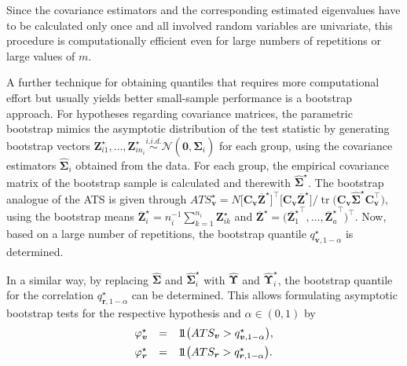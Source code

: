 Since the covariance estimators and the corresponding estimated eigenvalues
have to be calculated only once and all involved random variables are
univariate, this procedure is computationally efficient even for large numbers
of repetitions or large values of \(m\).

A further technique for obtaining quantiles that requires more computational
effort but usually yields better small-sample performance is a bootstrap
approach. For hypotheses regarding covariance matrices, the parametric
bootstrap mimics the asymptotic distribution of the test statistic by
generating bootstrap vectors
\(\boldsymbol{Z}_{i1}^\star, \dots, \boldsymbol{Z}_{in_i}^\star
\stackrel{i.i.d.}{\sim}
\mathcal{N}(\mathbf{0}, \widehat{\boldsymbol{\Sigma}}_i)\)
for each group, using the covariance estimators
\(\widehat{\boldsymbol{\Sigma}}_i\) obtained from the data. For each group, the empirical covariance matrix of the bootstrap sample is
calculated and therewith \(\widehat{\boldsymbol{\Sigma}}^\star\). The bootstrap analogue of
the ATS is given through \(ATS_{\boldsymbol{v}}^\star=
N
\bigl[
\boldsymbol{C}_{\boldsymbol{v}} \overline{\boldsymbol{Z}}^\star
\bigr]^\top
\bigl[
\boldsymbol{C}_{\boldsymbol{v}} \overline{\boldsymbol{Z}}^\star
\bigr]
\Big/
\operatorname{tr}
\bigl(
\boldsymbol{C}_{\boldsymbol{v}}
\widehat{\boldsymbol{\Sigma}}^\star
\boldsymbol{C}_{\boldsymbol{v}}^\top
\bigr),\) using the bootstrap means
\(\overline{\boldsymbol{Z}}_i^\star
=
n_i^{-1}
\sum_{k=1}^{n_i} \boldsymbol{Z}_{ik}^\star\)
and
\(\overline{\boldsymbol{Z}}^\star
=
\bigl(
{\overline{\boldsymbol{Z}}_1^\star}^\top, \dots,
{\overline{\boldsymbol{Z}}_a^\star}^\top
\bigr)^\top\). Now, based on a large number of repetitions, the bootstrap quantile
\(q_{\boldsymbol{v}, 1-\alpha}^{\star}\) is determined.

In a similar way, by replacing \(\widehat{\boldsymbol{\Sigma}}\) and \(\widehat{\boldsymbol{\Sigma}}_i^\star\) with
\(\widehat{\boldsymbol{\Upsilon}}\) and \(\widehat{\boldsymbol{\Upsilon}}_i^\star\), the bootstrap quantile
for the correlation
\(q_{\boldsymbol{r}, 1-\alpha}^{\star}\) can be determined. This allows
formulating asymptotic bootstrap tests for the respective hypothesis and
\(\alpha \in (0,1)\) by
\begin{equation}
\begin{array}{lrl}
\varphi_{\boldsymbol{v}}^{\star}
&=&
1\hspace{-0.7ex}1
\bigl(
ATS_{\boldsymbol{v}}
>
q_{\boldsymbol{v}, 1-\alpha}^{\star}
\bigr),
\\ [0.5em]
\varphi_{\boldsymbol{r}}^{\star}
&=&
1\hspace{-0.7ex}1
\bigl(
ATS_{\boldsymbol{r}}
>
q_{\boldsymbol{r}, 1-\alpha}^{\star}
\bigr).
\end{array}
\label{eq:bootstrap-tests}
\end{equation}

